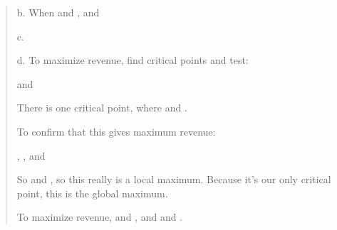 \begin{quote}
b. When and , and

c.

d. To maximize revenue, find critical points and test:

and

There is one critical point, where and .

To confirm that this gives maximum revenue:

, , and

So and , so this really is a local maximum. Because it's our only
critical point, this is the global maximum.

To maximize revenue, and , and and .
\end{quote}

